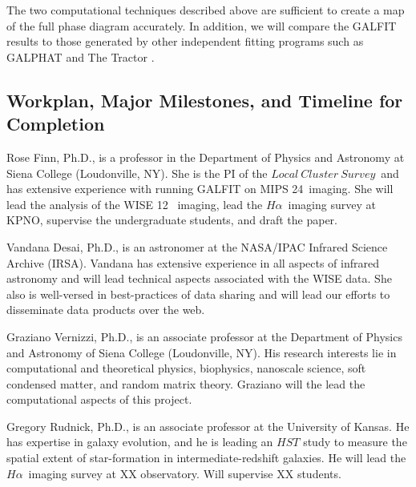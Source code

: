 \documentclass[12pt, preprint]{aastex}
\newcommand{\ha}{$H\alpha$}
\newcommand{\lcs}{$Local \ Cluster \ Survey $}
\begin{document}
{The two computational techniques described above are sufficient to
create a map of the full phase diagram accurately.  In addition, we
will compare the GALFIT results to those generated by other
independent fitting programs such as 
GALPHAT \citep{yoon11} and The Tractor \citep{lang16}.

\vspace*{-.9cm}\subsection{Workplan, Major Milestones, and Timeline for Completion }
\vspace*{-.3cm}
Rose Finn, Ph.D., is a professor in the Department of Physics
and Astronomy at Siena College (Loudonville, NY).  She is the PI of
the \lcs \ and has extensive experience with running GALFIT on MIPS
24\micron \ imaging.  She will lead the analysis of the WISE 12\micron
\ imaging, lead the \ha \ imaging survey at KPNO, supervise the undergraduate students, and draft the paper.

Vandana Desai, Ph.D., is an astronomer at the NASA/IPAC Infrared
  Science Archive (IRSA).   Vandana has extensive experience
in all aspects of infrared astronomy and will lead technical aspects
associated with the WISE data.  
She also is well-versed in best-practices of data sharing and will
lead our efforts to disseminate data products over the web.

Graziano Vernizzi, Ph.D., is an associate professor at the Department of
Physics and Astronomy of Siena College (Loudonville, NY).
His research interests lie in computational and theoretical
physics, biophysics, nanoscale science, soft condensed matter, and
random matrix theory. 
Graziano will the lead the computational
aspects of this project.

Gregory Rudnick, Ph.D., is an associate professor at the University of
Kansas.  He has expertise in galaxy evolution, and he is leading an
$HST$ study to measure the spatial extent of star-formation in
intermediate-redshift galaxies.  He will lead the \ha \ imaging survey
at XX observatory.   Will supervise XX students.


}
\end{document}
